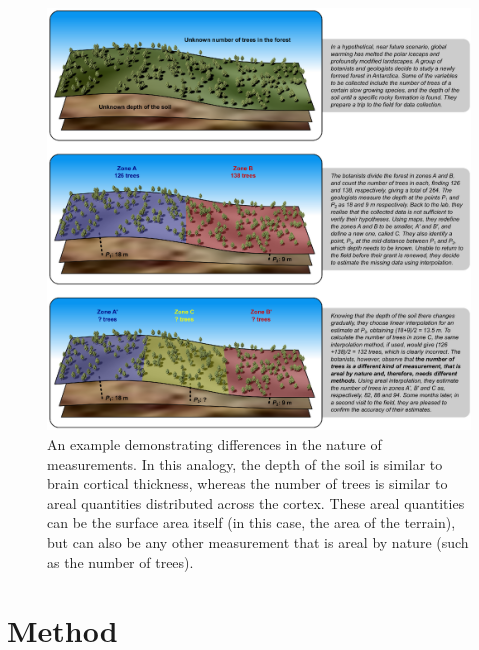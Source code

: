 \begin{figure}[!p]  %
\centering
\includegraphics[width=14cm]{images/forest.eps}
\caption[Example demonstrating differences between area and point measurements.]{An example demonstrating differences in the nature of measurements. In this analogy, the depth of the soil is similar to brain cortical thickness, whereas the number of trees is similar to areal quantities distributed across the cortex. These areal quantities can be the surface area itself (in this case, the area of the terrain), but can also be any other measurement that is areal by nature (such as the number of trees).}
\label{fig:forest}
\end{figure}

\section{Method}

